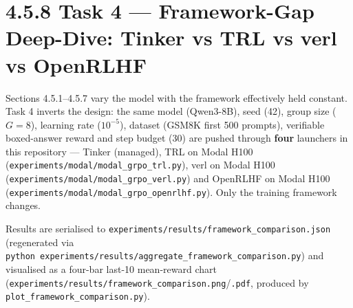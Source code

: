 \documentclass[
  american,
  11pt,
  a4paper,
  oneside]{report}
\begin{document}
\section{4.5.8 Task 4 --- Framework-Gap Deep-Dive: Tinker vs TRL vs verl
vs
OpenRLHF}\label{task-4-framework-gap-deep-dive-tinker-vs-trl-vs-verl-vs-openrlhf}

Sections 4.5.1--4.5.7 vary the model with the framework effectively held
constant. Task 4 inverts the design: the same model (Qwen3-8B), seed
(42), group size (\(G{=}8\)), learning rate (\(10^{-5}\)), dataset
(GSM8K first 500 prompts), verifiable boxed-answer reward and step
budget (30) are pushed through \textbf{four} launchers in this
repository --- Tinker (managed), TRL on Modal H100
(\texttt{experiments/modal/modal\_grpo\_trl.py}), verl on Modal H100
(\texttt{experiments/modal/modal\_grpo\_verl.py}) and OpenRLHF on Modal
H100 (\texttt{experiments/modal/modal\_grpo\_openrlhf.py}). Only the
training framework changes.

Results are serialised to
\texttt{experiments/results/framework\_comparison.json} (regenerated via
\texttt{python\ experiments/results/aggregate\_framework\_comparison.py})
and visualised as a four-bar last-10 mean-reward chart
(\texttt{experiments/results/framework\_comparison.png}/\texttt{.pdf},
produced by \texttt{plot\_framework\_comparison.py}).
\end{document}
